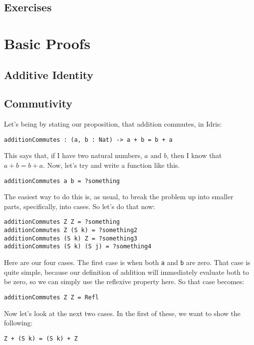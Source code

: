 \documentclass{article}
\newcommand{\inline}[1]{\texttt{#1}}
\begin{document}
\subsection{Exercises}

\section{Basic Proofs}
\subsection{Additive Identity}

\subsection{Commutivity}
Let's being by stating our proposition, that addition commutes, in Idris:

\begin{verbatim}
additionCommutes : (a, b : Nat) -> a + b = b + a
\end{verbatim}

This says that, if I have two natural numbers, $a$ and $b$, then I know that $a + b = b + a$.
Now, let’s try and write a function like this.

\begin{verbatim}
additionCommutes a b = ?something
\end{verbatim}

The easiest way to do this is, as usual, to break the problem up into smaller parts, specifically, into cases. So let’s do that now:

\begin{verbatim}
additionCommutes Z Z = ?something
additionCommutes Z (S k) = ?something2
additionCommutes (S k) Z = ?something3
additionCommutes (S k) (S j) = ?something4
\end{verbatim}

Here are our four cases.
The first case is when both \inline{a} and \inline{b} are zero.
That case is quite simple, because our definition of addition will immediately evaluate both to be zero, so we can simply use the reflexive property here.
So that case becomes:

\begin{verbatim}
additionCommutes Z Z = Refl
\end{verbatim}

Now let’s look at the next two cases. In the first of these, we want to show the following:
\begin{verbatim}
Z + (S k) = (S k) + Z
\end{verbatim}
\end{document}

